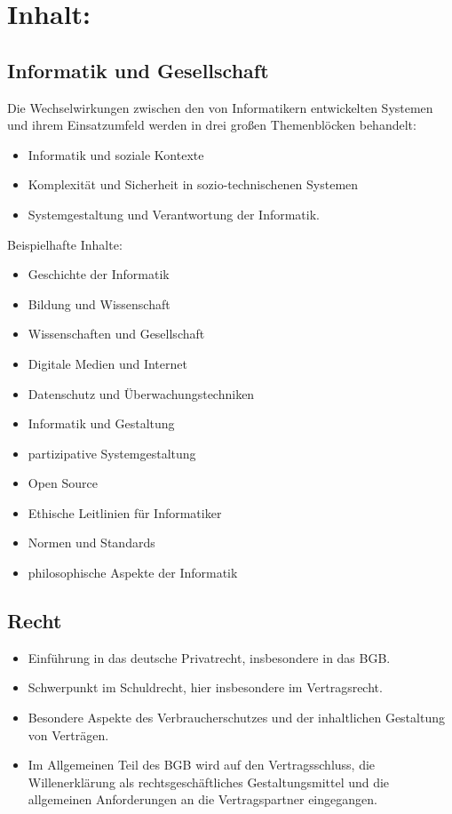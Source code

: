 \section*{Inhalt:}\label{inhalt-16}

\subsection*{Informatik und
Gesellschaft}\label{informatik-und-gesellschaft}

Die Wechselwirkungen zwischen den von Informatikern entwickelten
Systemen und ihrem Einsatzumfeld werden in drei großen Themenblöcken
behandelt:

\begin{itemize}
\item
  Informatik und soziale Kontexte
\item
  Komplexität und Sicherheit in sozio-technischenen Systemen
\item
  Systemgestaltung und Verantwortung der Informatik.
\end{itemize}

Beispielhafte Inhalte:

\begin{itemize}
\item
  Geschichte der Informatik
\item
  Bildung und Wissenschaft
\item
  Wissenschaften und Gesellschaft
\item
  Digitale Medien und Internet
\item
  Datenschutz und Überwachungstechniken
\item
  Informatik und Gestaltung
\item
  partizipative Systemgestaltung
\item
  Open Source
\item
  Ethische Leitlinien für Informatiker
\item
  Normen und Standards
\item
  philosophische Aspekte der Informatik
\end{itemize}

\subsection*{Recht}\label{recht}

\begin{itemize}
\item
  Einführung in das deutsche Privatrecht, insbesondere in das BGB.
\item
  Schwerpunkt im Schuldrecht, hier insbesondere im Vertragsrecht.
\item
  Besondere Aspekte des Verbraucherschutzes und der inhaltlichen
  Gestaltung von Verträgen.
\item
  Im Allgemeinen Teil des BGB wird auf den Vertragsschluss, die
  Willenerklärung als rechtsgeschäftliches Gestaltungsmittel und die
  allgemeinen Anforderungen an die Vertragspartner eingegangen.
\end{itemize}

